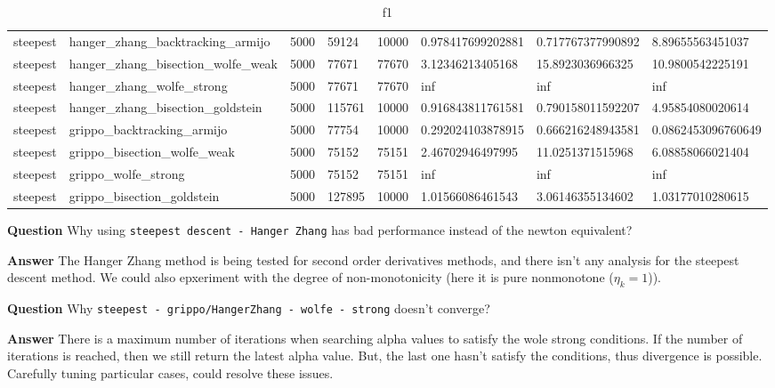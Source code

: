 \documentclass[a4paper,11pt]{article}
\numberwithin{equation}{section} %
\begin{document}
\begin{table}[h!]
{\begin{tabular}{|l|l|l|l|l|l|l|l|}
        steepest & hanger\_zhang\_backtracking\_armijo & 5000 & 59124 & 10000 & 0.978417699202881 & 0.717767377990892 & 8.89655563451037 \\
        steepest & hanger\_zhang\_bisection\_wolfe\_weak & 5000 & 77671 & 77670 & 3.12346213405168 & 15.8923036966325 & 10.9800542225191 \\
        steepest & hanger\_zhang\_wolfe\_strong & 5000 & 77671 & 77670 & inf & inf & inf \\
        steepest & hanger\_zhang\_bisection\_goldstein & 5000 & 115761 & 10000 & 0.916843811761581 & 0.790158011592207 & 4.95854080020614 \\
        steepest & grippo\_backtracking\_armijo & 5000 & 77754 & 10000 & 0.292024103878915 & 0.666216248943581 & 0.0862453096760649 \\
        steepest & grippo\_bisection\_wolfe\_weak & 5000 & 75152 & 75151 & 2.46702946497995 & 11.0251371515968 & 6.08858066021404 \\
        steepest & grippo\_wolfe\_strong & 5000 & 75152 & 75151 & inf & inf & inf \\
        steepest & grippo\_bisection\_goldstein & 5000 & 127895 & 10000 & 1.01566086461543 & 3.06146355134602 & 1.03177010280615 \\
\end{tabular}}
\caption{f1}
\label{table:f1}
\end{table}

\clearpage

\textbf{Question}
Why using \verb|steepest descent - Hanger Zhang| has bad performance instead of the newton equivalent?

\textbf{Answer}
The Hanger Zhang method is being tested for second order derivatives methods, and there isn't any analysis for the steepest descent method. We could also epxeriment with the degree of non-monotonicity (here it is pure nonmonotone ($\eta_k = 1$)).

\textbf{Question}
Why \verb|steepest - grippo/HangerZhang - wolfe - strong| doesn't converge?

\textbf{Answer}
There is a maximum number of iterations when searching alpha values to satisfy the wole strong conditions. If the number of iterations is reached, then we still return the latest alpha value. But, the last one hasn't satisfy the conditions, thus divergence is possible. Carefully tuning particular cases, could resolve these issues.
\end{document}
